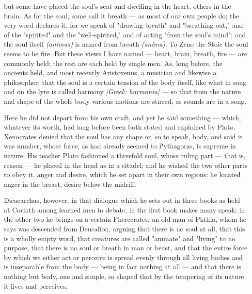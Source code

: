  but some have placed the soul's seat and dwelling in the heart, others in the brain. As for the soul, some call it breath — as most of our own people do; the very word declares it, for we speak of "drawing breath" and "breathing out," and of the "spirited" and the "well-spirited," and of acting "from the soul's mind"; and the soul itself \textit{(animus)} is named from breath \textit{(anima)}. To Zeno the Stoic the soul seems to be fire. But these views I have named — heart, brain, breath, fire — are commonly held; the rest are each held by single men. As, long before, the ancients held, and most recently Aristoxenus, a musician and likewise a philosopher: that the soul is a certain tension of the body itself, like what in song and on the lyre is called harmony \textit{[Greek: harmonia]} — so that from the nature and shape of the whole body various motions are stirred, as sounds are in a song.

 Here he did not depart from his own craft, and yet he said something — which, whatever its worth, had long before been both stated and explained by Plato. Xenocrates denied that the soul has any shape or, so to speak, body, and said it was number, whose force, as had already seemed to Pythagoras, is supreme in nature. His teacher Plato fashioned a threefold soul, whose ruling part — that is, reason — he placed in the head as in a citadel; and he wished the two other parts to obey it, anger and desire, which he set apart in their own regions: he located anger in the breast, desire below the midriff.

 Dicaearchus, however, in that dialogue which he sets out in three books as held at Corinth among learned men in debate, in the first book makes many speak; in the other two he brings on a certain Pherecrates, an old man of Phthia, whom he says was descended from Deucalion, arguing that there is no soul at all, that this is a wholly empty word, that creatures are called "animate" and "living" to no purpose, that there is no soul or breath in man or beast, and that the entire force by which we either act or perceive is spread evenly through all living bodies and is inseparable from the body — being in fact nothing at all — and that there is nothing but body, one and simple, so shaped that by the tempering of its nature it lives and perceives.

